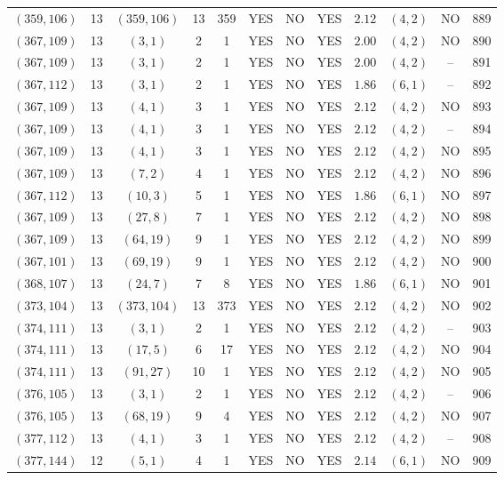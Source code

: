 \begin{longtable}{|c|c|c|c|c|c|c|c|c|c|c|c|}
$(359,106)$ & 13 & $(359,106)$ & 13 & 359 & YES & NO & YES & $2.12$ & $(4,2)$ & NO & 889\\
$(367,109)$ & 13 & $(3,1)$ & 2 & 1 & YES & NO & YES & $2.00$ & $(4,2)$ & NO & 890\\
$(367,109)$ & 13 & $(3,1)$ & 2 & 1 & YES & NO & YES & $2.00$ & $(4,2)$ & -- & 891\\
$(367,112)$ & 13 & $(3,1)$ & 2 & 1 & YES & NO & YES & $1.86$ & $(6,1)$ & -- & 892\\
$(367,109)$ & 13 & $(4,1)$ & 3 & 1 & YES & NO & YES & $2.12$ & $(4,2)$ & NO & 893\\
$(367,109)$ & 13 & $(4,1)$ & 3 & 1 & YES & NO & YES & $2.12$ & $(4,2)$ & -- & 894\\
$(367,109)$ & 13 & $(4,1)$ & 3 & 1 & YES & NO & YES & $2.12$ & $(4,2)$ & NO & 895\\
$(367,109)$ & 13 & $(7,2)$ & 4 & 1 & YES & NO & YES & $2.12$ & $(4,2)$ & NO & 896\\
$(367,112)$ & 13 & $(10,3)$ & 5 & 1 & YES & NO & YES & $1.86$ & $(6,1)$ & NO & 897\\
$(367,109)$ & 13 & $(27,8)$ & 7 & 1 & YES & NO & YES & $2.12$ & $(4,2)$ & NO & 898\\
$(367,109)$ & 13 & $(64,19)$ & 9 & 1 & YES & NO & YES & $2.12$ & $(4,2)$ & NO & 899\\
$(367,101)$ & 13 & $(69,19)$ & 9 & 1 & YES & NO & YES & $2.12$ & $(4,2)$ & NO & 900\\
$(368,107)$ & 13 & $(24,7)$ & 7 & 8 & YES & NO & YES & $1.86$ & $(6,1)$ & NO & 901\\
$(373,104)$ & 13 & $(373,104)$ & 13 & 373 & YES & NO & YES & $2.12$ & $(4,2)$ & NO & 902\\
$(374,111)$ & 13 & $(3,1)$ & 2 & 1 & YES & NO & YES & $2.12$ & $(4,2)$ & -- & 903\\
$(374,111)$ & 13 & $(17,5)$ & 6 & 17 & YES & NO & YES & $2.12$ & $(4,2)$ & NO & 904\\
$(374,111)$ & 13 & $(91,27)$ & 10 & 1 & YES & NO & YES & $2.12$ & $(4,2)$ & NO & 905\\
$(376,105)$ & 13 & $(3,1)$ & 2 & 1 & YES & NO & YES & $2.12$ & $(4,2)$ & -- & 906\\
$(376,105)$ & 13 & $(68,19)$ & 9 & 4 & YES & NO & YES & $2.12$ & $(4,2)$ & NO & 907\\
$(377,112)$ & 13 & $(4,1)$ & 3 & 1 & YES & NO & YES & $2.12$ & $(4,2)$ & -- & 908\\
$(377,144)$ & 12 & $(5,1)$ & 4 & 1 & YES & NO & YES & $2.14$ & $(6,1)$ & NO & 909\\

\end{longtable}
